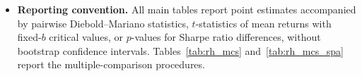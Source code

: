 \begin{itemize}
\begin{itemize}
  \end{itemize}
\item \textbf{Reporting convention.} All main tables report point estimates accompanied by pairwise Diebold--Mariano statistics, $t$-statistics of mean returns with fixed-$b$ critical values, or \citet{LedoitWolf2008} $p$-values for Sharpe ratio differences, without bootstrap confidence intervals. Tables~\ref{tab:rh_mcs} and~\ref{tab:rh_mcs_spa} report the multiple-comparison procedures.
\end{itemize}



